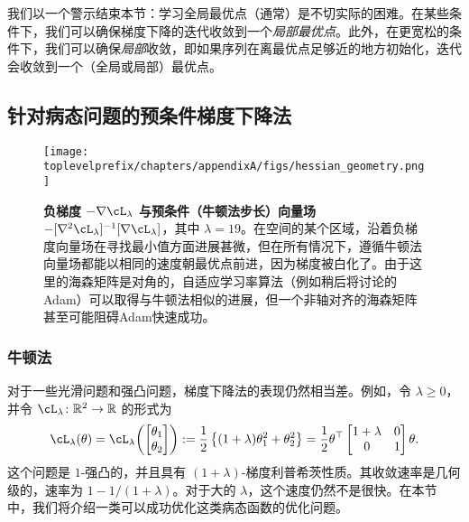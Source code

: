 \documentclass[../../book-main.tex]{subfiles}
\begin{document}
我们以一个警示结束本节：学习全局最优点（通常）是不切实际的困难。在某些条件下，我们可以确保梯度下降的迭代收敛到一个\textit{局部最优点}。此外，在更宽松的条件下，我们可以确保\textit{局部}收敛，即如果序列在离最优点足够近的地方初始化，迭代会收敛到一个（全局或局部）最优点。


\subsection{针对病态问题的预条件梯度下降法}


\begin{figure}
    \texttt{[image: \\toplevelprefix/chapters/appendixA/figs/hessian\_geometry.png]}
    \caption{\small\textbf{负梯度 \(-\nabla \cL_{\lambda}\) 与预条件（牛顿法步长）向量场 \(-[\nabla^{2}\cL_{\lambda}]^{-1}[\nabla \cL_{\lambda}]\)}，其中 \(\lambda = 19\)。在空间的某个区域，沿着负梯度向量场在寻找最小值方面进展甚微，但在所有情况下，遵循牛顿法向量场都能以相同的速度朝最优点前进，因为梯度被白化了。由于这里的海森矩阵是对角的，自适应学习率算法（例如稍后将讨论的Adam）可以取得与牛顿法相似的进展，但一个非轴对齐的海森矩阵甚至可能阻碍Adam快速成功。}
    \label{fig:hessian_geometry}
\end{figure}

\subsubsection{牛顿法}

对于一些光滑问题和强凸问题，梯度下降法的表现仍然相当差。例如，令 \(\lambda \geq 0\)，并令 \(\cL_{\lambda} \colon \R^{2} \to \R\) 的形式为
\begin{equation}
    \cL_{\lambda}(\theta) = \cL_{\lambda}\rp{\mat{\theta_{1} \\ \theta_{2}}} := \frac{1}{2}\bc{(1 + \lambda) \theta_{1}^{2} + \theta_{2}^{2}} = \frac{1}{2}\theta^{\top}\mat{1 + \lambda & 0 \\ 0 & 1}\theta.
\end{equation}
这个问题是 \(1\)-强凸的，并且具有 \((1 + \lambda)\)-梯度利普希茨性质。其收敛速率是几何级的，速率为 \(1 - 1/(1 + \lambda)\)。对于大的 \(\lambda\)，这个速度仍然不是很快。在本节中，我们将介绍一类可以成功优化这类病态函数的优化问题。
\end{document}
